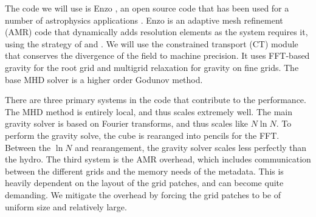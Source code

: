 The code we will use is Enzo \citep{Collins10,Bryan14}, an open source code that
has been used for a number of astrophysics applications
\citep{Abel02,CorreaMagnus23}.  Enzo is an adaptive mesh refinement (AMR) code
that dynamically adds resolution elements as the system requires it, using the
strategy of \citet{Berger89} and \citet{Balsar01}.  We will
use the constrained transport (CT) module \citep{Gardiner05,Collins10} that conserves the
divergence of the field to machine precision.  It uses FFT-based gravity for the
root grid and multigrid relaxation for gravity on fine grids.  The base MHD
solver is a higher order Godunov method.  

There are three primary systems in the code that contribute to the performance.
The MHD method is entirely local, and thus scales extremely well.  The main
gravity solver is based on Fourier transforms, and thus scales like $N\ln N$.
To perform the gravity solve, the cube is rearanged into pencils for the FFT.
Between the $\ln N$ and rearangement, the gravity solver scales less perfectly
than the hydro.  The third system is the AMR overhead, which includes
communication between the different grids and the memory needs of the metadata.
This is heavily dependent on the layout of the grid patches, and can become
quite demanding.  We mitigate the overhead by forcing the grid patches to be of
uniform size and relatively large.

